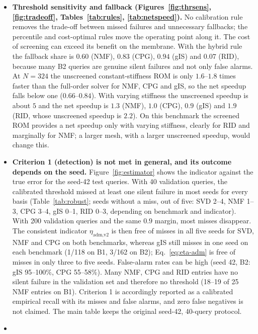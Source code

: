 \documentclass[11pt,a4paper]{article}
\begin{document}
\begin{itemize}
\item
  \textbf{Threshold sensitivity and fallback (Figures~\ref{fig:thrsens}, \ref{fig:tradeoff}, Tables~\ref{tab:rules}, \ref{tab:netspeed}).} No calibration rule removes the trade-off between missed failures and unnecessary fallbacks; the percentile and cost-optimal rules move the operating point along it. The cost of screening can exceed its benefit on the membrane. With the hybrid rule the fallback share is $0.60$ (NMF), $0.83$ (CPG), $0.94$ (gIS) and $0.07$ (RID), because many B2 queries are genuine silent failures and not only false alarms. At $N = 324$ the unscreened constant-stiffness ROM is only $1.6$--$1.8$ times faster than the full-order solver for NMF, CPG and gIS, so the net speedup falls below one ($0.66$--$0.84$). With varying stiffness the unscreened speedup is about $5$ and the net speedup is $1.3$ (NMF), $1.0$ (CPG), $0.9$ (gIS) and $1.9$ (RID, whose unscreened speedup is $2.2$). On this benchmark the screened ROM provides a net speedup only with varying stiffness, clearly for RID and marginally for NMF; a larger mesh, with a larger unscreened speedup, would change this.
\item
  \textbf{Criterion 1 (detection) is not met in general, and its outcome depends on the seed.} Figure~\ref{fig:estimator} shows the indicator against the true error for the seed-42 test queries. With 40 validation queries, the calibrated threshold missed at least one silent failure in most seeds for every basis (Table~\ref{tab:robust}; seeds without a miss, out of five: SVD 2--4, NMF 1--3, CPG 3--4, gIS 0--1, RID 0--3, depending on benchmark and indicator). With 200 validation queries and the same $0.9$ margin, most misses disappear. The consistent indicator \(\eta_{\text{adm,v2}}\) is then free of misses in all five seeds for SVD, NMF and CPG on both benchmarks, whereas gIS still misses in one seed on each benchmark (1/118 on B1, 3/162 on B2); Eq.~\eqref{eq:eta-adm} is free of misses in only three to five seeds. False-alarm rates can be high (seed 42, B2: gIS 95--100\%, CPG 55--58\%). Many NMF, CPG and RID entries have no silent failure in the validation set and therefore no threshold (18--19 of 25 NMF entries on B1). Criterion 1 is accordingly reported as a calibrated empirical recall with its misses and false alarms, and zero false negatives is not claimed. The main table keeps the original seed-42, 40-query protocol.
\item

\end{itemize}
\end{document}
